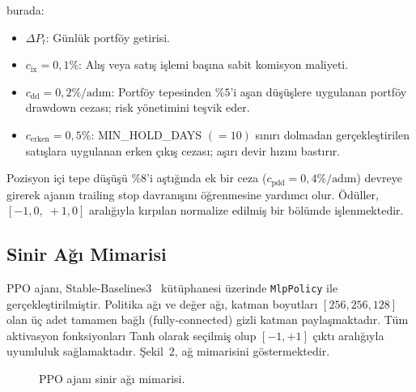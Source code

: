 \documentclass[journal]{IEEEtran}
\begin{document}
\noindent burada:
\begin{itemize}
  \item $\Delta P_t$: Günlük portföy getirisi.
  \item $c_{\text{ix}} = 0{,}1\%$: Alış veya satış işlemi başına
        sabit komisyon maliyeti.
  \item $c_{\text{dd}} = 0{,}2\%/\text{adım}$: Portföy tepesinden
        $\%5$'i aşan düşüşlere uygulanan portföy drawdown cezası;
        risk yönetimini teşvik eder.
  \item $c_{\text{erken}} = 0{,}5\%$: MIN\_HOLD\_DAYS $(= 10)$ sınırı
        dolmadan gerçekleştirilen satışlara uygulanan erken çıkış
        cezası; aşırı devir hızını bastırır.
\end{itemize}

Pozisyon içi tepe düşüşü $\%8$'i aştığında ek bir ceza
($c_{\text{pdd}} = 0{,}4\%/\text{adım}$) devreye girerek ajanın
trailing stop davranışını öğrenmesine yardımcı olur. Ödüller,
$[-1{,}0,\; +1{,}0]$ aralığıyla kırpılan normalize edilmiş bir
bölümde işlenmektedir.

\subsection{Sinir Ağı Mimarisi}

PPO ajanı, Stable-Baselines3~\cite{raffin2021} kütüphanesi üzerinde
\texttt{MlpPolicy} ile gerçekleştirilmiştir. Politika ağı ve değer
ağı, katman boyutları $[256, 256, 128]$ olan üç adet tamamen bağlı
(fully-connected) gizli katman paylaşmaktadır. Tüm aktivasyon
fonksiyonları Tanh olarak seçilmiş olup $[-1, +1]$ çıktı aralığıyla
uyumluluk sağlamaktadır. Şekil~2, ağ mimarisini göstermektedir.

\begin{figure}[ht]
\centering
{}
\caption{PPO ajanı sinir ağı mimarisi.}
\label{fig:nn}
\end{figure}
\end{document}
